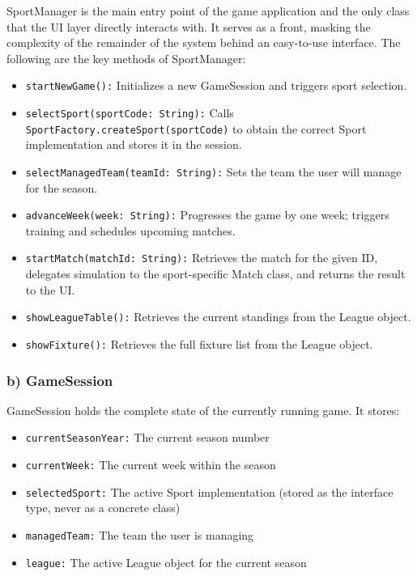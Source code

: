 \documentclass[12pt, a4paper]{article}
\begin{document}
SportManager is the main entry point of the game application and the only class that
the UI layer directly interacts with. It serves as a front, masking the complexity of the
remainder of the system behind an easy-to-use interface. The following are the key
methods of SportManager:

\begin{itemize}
    \item \texttt{startNewGame():} Initializes a new GameSession and triggers sport selection.
    \item \texttt{selectSport}\allowbreak\texttt{(sportCode:\,String):} Calls \texttt{SportFactory.}\allowbreak\texttt{createSport(sportCode)} to obtain the correct Sport implementation and stores it in the session.
    \item \texttt{selectManagedTeam}\allowbreak\texttt{(teamId:\,String):} Sets the team the user will manage for the season.
    \item \texttt{advanceWeek}\allowbreak\texttt{(week:\,String):} Progresses the game by one week; triggers training and schedules upcoming matches.
    \item \texttt{startMatch}\allowbreak\texttt{(matchId:\,String):} Retrieves the match for the given ID, delegates simulation to the sport-specific Match class, and returns the result to the UI.
    \item \texttt{showLeagueTable():} Retrieves the current standings from the League object.
    \item \texttt{showFixture():} Retrieves the full fixture list from the League object.
\end{itemize}

\subsubsection*{b) GameSession}

GameSession holds the complete state of the currently running game. It stores:

\begin{itemize}
    \item \texttt{currentSeasonYear:} The current season number
    \item \texttt{currentWeek:} The current week within the season
    \item \texttt{selectedSport:} The active Sport implementation (stored as the interface type, never as a concrete class)
    \item \texttt{managedTeam:} The team the user is managing
    \item \texttt{league:} The active League object for the current season
\end{itemize}
\end{document}
